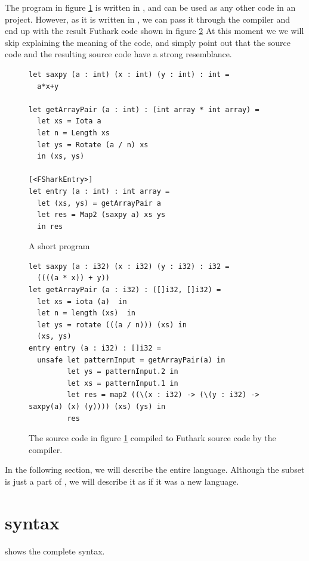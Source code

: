 The program in figure \ref{fig:shortfsharkprogram0'} is written in \fshark{},
and can be used as any other \fsharp{} code in an \fsharp{} project.
However, as it is written in \fshark{}, we can pass it through the \fshark{}
compiler and end up with the result Futhark code shown in figure \ref{fig:shortfsharkprogram1'}
At this moment we we will skip explaining the meaning of the code, and simply
point out that the \fshark{} source code and the resulting source code have a
strong resemblance.
\begin{figure}[H]
  \centering
\begin{verbatim}
let saxpy (a : int) (x : int) (y : int) : int =
  a*x+y

let getArrayPair (a : int) : (int array * int array) =
  let xs = Iota a
  let n = Length xs
  let ys = Rotate (a / n) xs
  in (xs, ys)

[<FSharkEntry>]
let entry (a : int) : int array =
  let (xs, ys) = getArrayPair a
  let res = Map2 (saxpy a) xs ys
  in res
\end{verbatim}
  \caption{A short \fshark{} program}
  \label{fig:shortfsharkprogram0'}
\end{figure}

\begin{figure}[H]
  \centering
  \begin{lstlisting}[language=Futhark, breaklines]
let saxpy (a : i32) (x : i32) (y : i32) : i32 =
  ((((a * x)) + y))
let getArrayPair (a : i32) : ([]i32, []i32) =
  let xs = iota (a)  in
  let n = length (xs)  in
  let ys = rotate (((a / n))) (xs) in
  (xs, ys)
entry entry (a : i32) : []i32 =
  unsafe let patternInput = getArrayPair(a) in
         let ys = patternInput.2 in
         let xs = patternInput.1 in
         let res = map2 ((\(x : i32) -> (\(y : i32) -> saxpy(a) (x) (y)))) (xs) (ys) in
         res
\end{lstlisting}
  \caption{The source code in figure \ref{fig:shortfsharkprogram0'} compiled to
    Futhark source code by the \fshark{} compiler.}
  \label{fig:shortfsharkprogram1'}
\end{figure}

In the following section, we will describe the entire \fshark{} language. Although the
subset is just a part of \fsharp{}, we will describe it as if it was a new language.

\clearpage
\section{\fshark{} syntax}
shows the complete \fshark{} syntax.

